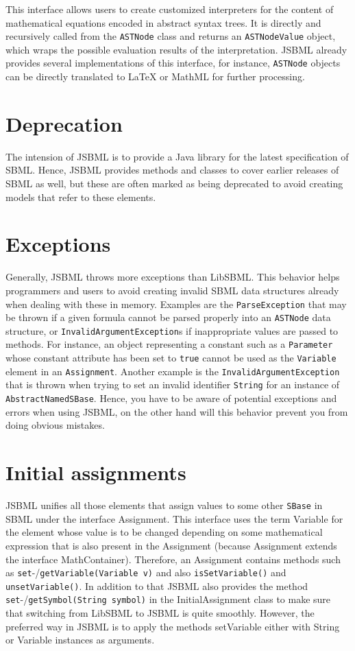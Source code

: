 \documentclass[
  letterpaper,
  12pt,
  headsepline,
  pointlessnumbers,
  tablecaptionabove,
  headinclude,
  appendixprefix,
  idxtotoc,
  bibtotoc
]{scrartcl}
\begin{document}
This interface allows users to create customized interpreters for the
content of mathematical equations encoded in abstract syntax trees. It
is directly and recursively called from the \verb!ASTNode! class and returns
an \verb!ASTNodeValue! object, which wraps the possible evaluation results of
the interpretation. JSBML already provides several implementations of
this interface, for instance, \verb!ASTNode! objects can be directly translated
to LaTeX or MathML for further processing.

\section{Deprecation}

The intension of JSBML is to provide a Java library for the latest 
specification of SBML. Hence, JSBML provides methods and classes to
cover earlier releases of SBML as well, but these are often marked
as being deprecated to avoid creating models that refer to these 
elements.

\section{Exceptions}

Generally, JSBML throws more exceptions than LibSBML. This behavior helps
programmers and users to avoid creating invalid SBML data structures already
when dealing with these in memory. Examples are the \verb!ParseException! that
may be thrown if a given formula cannot be parsed properly into an \verb!ASTNode!
data structure, or \verb!InvalidArgumentException!s if inappropriate values are
passed to methods. For instance, an object representing a constant such as a
\verb!Parameter! whose constant attribute has been set to \verb!true! cannot be
used as the \verb!Variable! element in an \verb!Assignment!. Another example is
the \verb!InvalidArgumentException! that is thrown when trying to set an invalid
identifier \verb!String! for an instance of \verb!AbstractNamedSBase!. Hence,
you have to be aware of potential exceptions and errors when using JSBML, on the
other hand will this behavior prevent you from doing obvious mistakes.

\section{Initial assignments}

JSBML unifies all those elements that assign values to some other 
\verb!SBase! in SBML under the interface Assignment. This interface uses
the term Variable for the element whose value is to be changed depending
on some mathematical expression that is also present in the Assignment
(because Assignment extends the interface MathContainer). Therefore,
an Assignment contains methods such as \verb!set!-/\verb!getVariable(Variable v)!
and also \verb!isSetVariable()! and \verb!unsetVariable()!. In addition to that
JSBML also provides the method \verb!set!-/\verb!getSymbol(String symbol)! in the
InitialAssignment class to make sure that switching from LibSBML to
JSBML is quite smoothly. However, the preferred way in JSBML is to
apply the methods setVariable either with String or Variable instances
as arguments.
\end{document}
